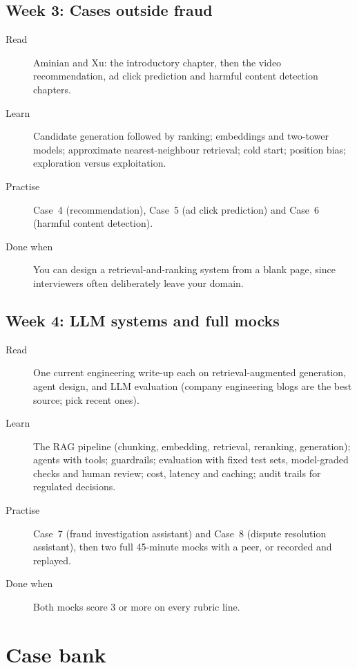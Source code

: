 \documentclass[10pt,a4paper]{article}
\begin{document}
\subsection{Week 3: Cases outside fraud}
\begin{description}
  \item[Read] Aminian and Xu: the introductory chapter, then the video
    recommendation, ad click prediction and harmful content detection
    chapters.
  \item[Learn] Candidate generation followed by ranking; embeddings and
    two-tower models; approximate nearest-neighbour retrieval; cold start;
    position bias; exploration versus exploitation.
  \item[Practise] Case~4 (recommendation), Case~5 (ad click prediction) and
    Case~6 (harmful content detection).
  \item[Done when] You can design a retrieval-and-ranking system from a blank
    page, since interviewers often deliberately leave your domain.
\end{description}

\subsection{Week 4: LLM systems and full mocks}
\begin{description}
  \item[Read] One current engineering write-up each on retrieval-augmented
    generation, agent design, and LLM evaluation (company engineering blogs
    are the best source; pick recent ones).
  \item[Learn] The RAG pipeline (chunking, embedding, retrieval, reranking,
    generation); agents with tools; guardrails; evaluation with fixed test
    sets, model-graded checks and human review; cost, latency and caching;
    audit trails for regulated decisions.
  \item[Practise] Case~7 (fraud investigation assistant) and Case~8 (dispute
    resolution assistant), then two full 45-minute mocks with a peer, or
    recorded and replayed.
  \item[Done when] Both mocks score 3 or more on every rubric line.
\end{description}

\section{Case bank}
\end{document}
